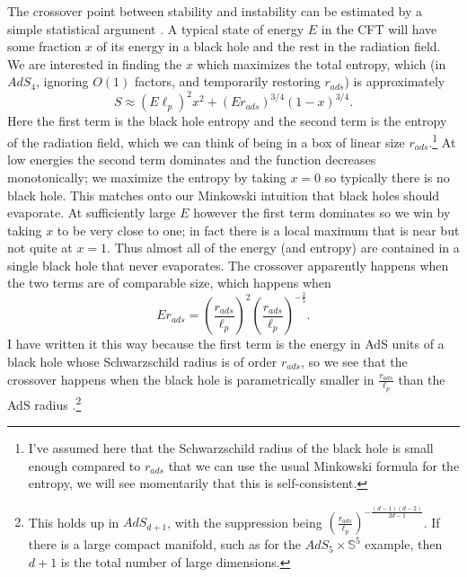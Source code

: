 \documentclass[12pt]{article}
\newcommand{\be}{\begin{equation}}
\newcommand{\ee}{\end{equation}}
\begin{document}
The crossover point between stability and instability can be estimated by a simple statistical argument \cite{Horowitz:1999uv}.  A typical state of energy $E$ in the CFT will have some fraction $x$ of its energy in a black hole and the rest in the radiation field.  We are interested in finding the $x$ which maximizes the total entropy, which (in $AdS_4$, ignoring $O(1)$ factors, and temporarily restoring $r_{ads}$) is approximately
\be
S\approx(E \ell_p)^2 x^2+(E r_{ads})^{3/4}(1-x)^{3/4}.
\ee
Here the first term is the black hole entropy and the second term is the entropy of the radiation field, which we can think of being in a box of linear size $r_{ads}$.\footnote{I've assumed here that the Schwarzschild radius of the black hole is small enough compared to $r_{ads}$ that we can use the usual Minkowski formula for the entropy, we will see momentarily that this is self-consistent.}  At low energies the second term dominates and the function decreases monotonically; we maximize the entropy by taking $x=0$ so typically there is no black hole.  This matches onto our Minkowski intuition that black holes should evaporate.  At sufficiently large $E$ however the first term dominates so we win by taking $x$ to be very close to one; in fact there is a local maximum that is near but not quite at $x=1$.  Thus almost all of the energy (and entropy) are contained in a single black hole that never evaporates.  The crossover apparently happens when the two terms are of comparable size, which happens when
\be\label{MCcross}
Er_{ads}=\left(\frac{r_{ads}}{\ell_p}\right)^2\left(\frac{r_{ads}}{\ell_p}\right)^{-\frac{2}{5}}.
\ee
I have written it this way because the first term is the energy in AdS units of a black hole whose Schwarzschild radius is of order $r_{ads}$, so we see that the crossover happens when the black hole is parametrically smaller in $\frac{r_{ads}}{\ell_p}$ than the AdS radius \cite{Horowitz:1999uv}.\footnote{This holds up in $AdS_{d+1}$, with the suppression being $\left(\frac{r_{ads}}{\ell_p}\right)^{-\frac{(d-1)(d-2)}{2d-1}}$.  If there is a large compact manifold, such as for the $AdS_5\times \mathbb{S}^5$ example, then $d+1$ is the total number of large dimensions.}  
\end{document}
